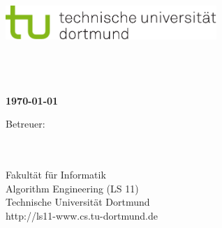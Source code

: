 \begin{titlepage}
\vspace*{-2cm}
\newlength{\links}
\setlength{\links}{-1.5cm}
\sf
\LARGE

\hspace*{\links}
\begin{minipage}{12.5cm}
\includegraphics[width=8cm]{bilder/tulogo-rgb}
\end{minipage}

\vspace*{4cm}

\hspace*{\links}
\hspace*{-0.2cm}
\begin{minipage}{8.5cm}
\large
\begin{center}
{\Large \MeineArbeit} \\
\vspace*{1cm}
\bf{ \MeinTitel } \\
\vspace*{1.5cm}
\MeinVorame \MeinNachname\\
\today
\end{center}
\end{minipage}

\vspace*{3.7cm}

\hspace*{\links}

\vspace*{1.5cm}

\vspace*{.6cm}

\hspace*{\links}
\begin{minipage}[b]{5cm}
\normalsize
\raggedright
Betreuer: \\
\Erstbetreuer \\
\Zweitbetreuer \\
\end{minipage}

\vspace*{2.5cm}
\hspace*{\links}
\begin{minipage}[b]{8cm}
\normalsize
\raggedright
Fakultät für Informatik\\
Algorithm Engineering (LS 11)\\
Technische Universität Dortmund \\
http://ls11-www.cs.tu-dortmund.de
\end{minipage}


\end{titlepage}
